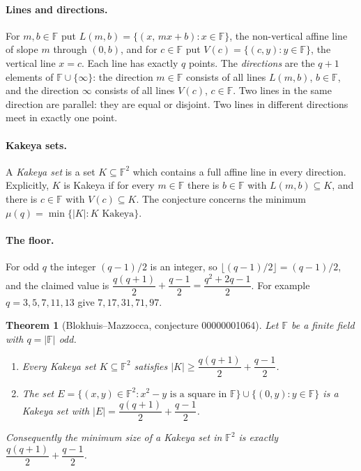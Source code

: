 \documentclass[11pt,a4paper]{article}
\newtheorem{theorem}{Theorem}[section]
\theoremstyle{definition}
\theoremstyle{remark}
\newcommand{\F}{\mathbb{F}}
\begin{document}
\paragraph{Lines and directions.} For $m,b\in\F$ put
$L(m,b)=\{(x,\,mx+b): x\in\F\}$, the non-vertical affine line of slope $m$ through $(0,b)$, and for
$c\in\F$ put $V(c)=\{(c,y): y\in\F\}$, the vertical line $x=c$. Each line has exactly $q$ points.
The \emph{directions} are the $q+1$ elements of $\F\cup\{\infty\}$: the direction $m\in\F$ consists
of all lines $L(m,b)$, $b\in\F$, and the direction $\infty$ consists of all lines $V(c)$, $c\in\F$.
Two lines in the same direction are parallel: they are equal or disjoint. Two lines in different
directions meet in exactly one point.

\paragraph{Kakeya sets.} A \emph{Kakeya set} is a set $K\subseteq\F^2$ which contains a full
affine line in every direction. Explicitly, $K$ is Kakeya if for every $m\in\F$ there is $b\in\F$
with $L(m,b)\subseteq K$, and there is $c\in\F$ with $V(c)\subseteq K$. The conjecture concerns the
minimum $\mu(q)=\min\{|K|: K \text{ Kakeya}\}$.

\paragraph{The floor.} For odd $q$ the integer $(q-1)/2$ is an integer, so
$\lfloor (q-1)/2\rfloor=(q-1)/2$, and the claimed value is
$\dfrac{q(q+1)}{2}+\dfrac{q-1}{2}=\dfrac{q^2+2q-1}{2}$. For example $q=3,5,7,11,13$ give $7,17,31,71,97$.

\begin{theorem}[Blokhuis--Mazzocca, conjecture 00000001064]\label{thm:main}
Let $\F$ be a finite field with $q=|\F|$ odd.
\begin{enumerate}
\item[(a)] Every Kakeya set $K\subseteq\F^2$ satisfies $|K|\ge \dfrac{q(q+1)}{2}+\dfrac{q-1}{2}$.
\item[(b)] The set $E=\{(x,y)\in\F^2 : x^2-y\text{ is a square in }\F\}\cup\{(0,y): y\in\F\}$ is a
Kakeya set with $|E|=\dfrac{q(q+1)}{2}+\dfrac{q-1}{2}$.
\end{enumerate}
Consequently the minimum size of a Kakeya set in $\F^2$ is exactly $\dfrac{q(q+1)}{2}+\dfrac{q-1}{2}$.
\end{theorem}
\end{document}
